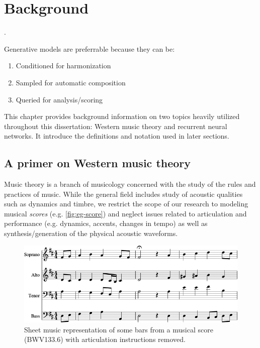 \documentclass[dissertation.tex]{subfiles}
\begin{document}
\chapter{Background}

.

Generative models are preferrable because they can be:
\begin{enumerate}
  \item Conditioned for harmonization
  \item Sampled for automatic composition
  \item Queried for analysis/scoring
\end{enumerate}


This chapter provides background information on two topics heavily utilized
throughout this dissertation: Western music theory and recurrent neural
networks. It introduce the definitions and notation used in later sections.

\section{A primer on Western music theory}

Music theory is a branch of musicology concerned with the study of the rules
and practices of music. While the general field includes study of acoustic
qualities such as dynamics and timbre, we restrict the scope of our research to
modeling musical \emph{scores} (e.g. \autoref{fig:eg-score}) and neglect issues
related to articulation and performance (e.g. dynamics, accents, changes in
tempo) as well as synthesis/generation of the physical acoustic waveforms.

\begin{figure}[htbp]
    \centering
    \includegraphics[width=0.8\linewidth]{Figures/bwv133-6-original-score-1.png}
    \caption{Sheet music representation of some bars from a musical score
    (BWV133.6) with articulation instructions removed.}
    \label{fig:eg-score}
\end{figure}
\end{document}
